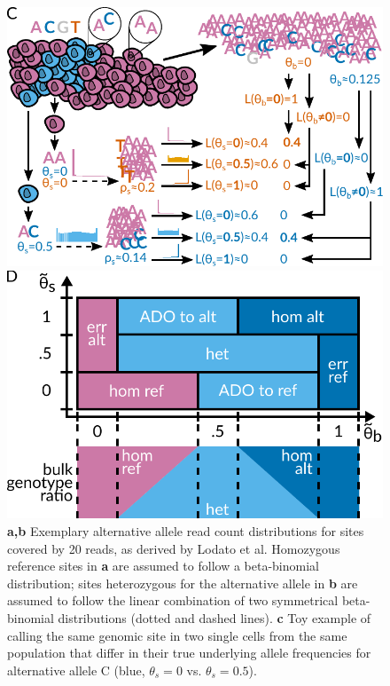 \documentclass[12pt,inline]{wlscirep}
\begin{document}
\begin{figure}[!tpb]
\begin{minipage}[t]{.99\linewidth}
\begin{minipage}{.47\linewidth}
      \includegraphics[width=.95\linewidth]{figs/prosolo_alt-calling_overview.pdf}
    \end{minipage}
    \hspace{2ex}
    \begin{minipage}{.49\linewidth}
      \includegraphics[width=.95\linewidth]{figs/Event_space.pdf}
    \end{minipage}
  \end{minipage}
  \caption{
   \textbf{a,b} Exemplary alternative allele read count distributions for sites covered by 20 reads, as derived by Lodato et al.\cite{lodato_somatic_2015}
   Homozygous reference sites in \textbf{a} are assumed to follow a beta-binomial distribution;
   sites heterozygous for the alternative allele in \textbf{b} are assumed to follow the linear combination of two symmetrical beta-binomial distributions (dotted and dashed lines).
   \textbf{c} Toy example of calling the same genomic site in two single cells from the same population that differ in their true underlying allele frequencies for alternative allele C (blue, $\theta_s = 0$ vs. $\theta_s = 0.5$).
}
\end{figure}
\end{document}
